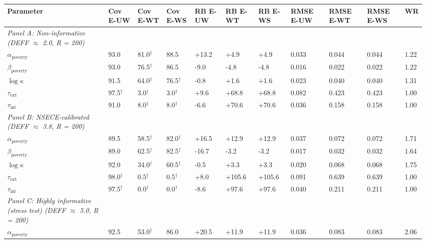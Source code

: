 \begin{table}[htbp]
\centering
\begin{tabular}{lllllllllll}
  \toprule
Parameter & Cov E-UW & Cov E-WT & Cov E-WS & RB E-UW & RB E-WT & RB E-WS & RMSE E-UW & RMSE E-WT & RMSE E-WS & WR \\ 
  \midrule
\textit{Panel A: Non-informative (DEFF $\approx$ 2.0, R = 200)} &  &  &  &  &  &  &  &  &  &  \\ 
  $\alpha_{\text{poverty}}$ & 93.0 & 81.0$^{\dagger}$ & 88.5 & +13.2 & +4.9 & +4.9 & 0.033 & 0.044 & 0.044 & 1.22 \\ 
  $\beta_{\text{poverty}}$ & 93.0 & 76.5$^{\dagger}$ & 86.5 & -9.0 & -4.8 & -4.8 & 0.016 & 0.022 & 0.022 & 1.22 \\ 
  $\log\kappa$ & 91.5 & 64.0$^{\dagger}$ & 76.5$^{\dagger}$ & -0.8 & +1.6 & +1.6 & 0.023 & 0.040 & 0.040 & 1.31 \\ 
  $\tau_{\text{ext}}$ & 97.5$^{\dagger}$ & 3.0$^{\dagger}$ & 3.0$^{\dagger}$ & +9.6 & +68.8 & +68.8 & 0.082 & 0.423 & 0.423 & 1.00 \\ 
  $\tau_{\text{int}}$ & 91.0 & 8.0$^{\dagger}$ & 8.0$^{\dagger}$ & -6.6 & +70.6 & +70.6 & 0.036 & 0.158 & 0.158 & 1.00 \\ 
  \textit{Panel B: NSECE-calibrated (DEFF $\approx$ 3.8, R = 200)} &  &  &  &  &  &  &  &  &  &  \\ 
  $\alpha_{\text{poverty}}$ & 89.5 & 58.5$^{\dagger}$ & 82.0$^{\dagger}$ & +16.5 & +12.9 & +12.9 & 0.037 & 0.072 & 0.072 & 1.71 \\ 
  $\beta_{\text{poverty}}$ & 89.0 & 62.5$^{\dagger}$ & 82.5$^{\dagger}$ & -16.7 & -3.2 & -3.2 & 0.017 & 0.032 & 0.032 & 1.64 \\ 
  $\log\kappa$ & 92.0 & 34.0$^{\dagger}$ & 60.5$^{\dagger}$ & -0.5 & +3.3 & +3.3 & 0.020 & 0.068 & 0.068 & 1.75 \\ 
  $\tau_{\text{ext}}$ & 98.0$^{\dagger}$ & 0.5$^{\dagger}$ & 0.5$^{\dagger}$ & +8.0 & +105.6 & +105.6 & 0.091 & 0.639 & 0.639 & 1.00 \\ 
  $\tau_{\text{int}}$ & 97.5$^{\dagger}$ & 0.0$^{\dagger}$ & 0.0$^{\dagger}$ & -8.6 & +97.6 & +97.6 & 0.040 & 0.211 & 0.211 & 1.00 \\ 
  \textit{Panel C: Highly informative (stress test) (DEFF $\approx$ 5.0, R = 200)} &  &  &  &  &  &  &  &  &  &  \\ 
  $\alpha_{\text{poverty}}$ & 92.5 & 53.0$^{\dagger}$ & 86.0 & +20.5 & +11.9 & +11.9 & 0.036 & 0.083 & 0.083 & 2.06 \\ 

\end{tabular}
\end{table}
